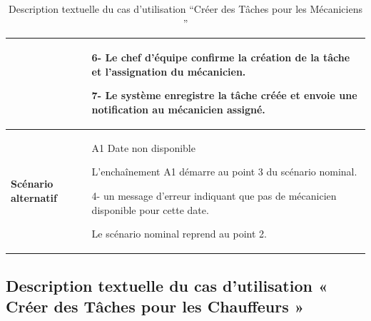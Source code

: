 \begin{table}[H]
  \centering
  \renewcommand{\arraystretch}{1} %
  \begin{tabular}{|p{4cm}|p{9cm}|}


                                 & 6- Le chef d'équipe confirme la création de la tâche et l'assignation du mécanicien.\newline

    7- Le système enregistre la tâche créée et envoie une notification au mécanicien assigné.                                   \\
    \hline
    \textbf{Scénario alternatif} & A1 Date non disponible \newline

    L’enchaînement A1 démarre au point 3 du scénario nominal.\newline

    4- un message d’erreur indiquant que pas de mécanicien disponible pour cette date.\newline

    Le scénario nominal reprend au point 2.                                                                                     \\


    \hline
  \end{tabular}
  \caption{Description textuelle du cas d’utilisation “Créer des Tâches pour les Mécaniciens ”}

\end{table}

\bigskip

\subsection{Description textuelle du cas d’utilisation « Créer des Tâches pour les Chauffeurs »}

